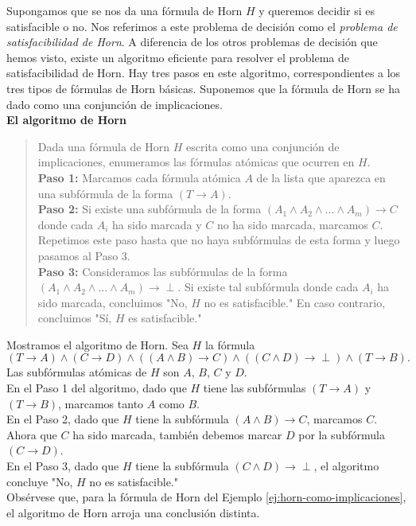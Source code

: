 \message{ !name(main.tex)}\documentclass[12pt,a4paper]{book}
\newcommand{\comillas}[1]{"#1"}
\begin{document}
    Supongamos que se nos da una fórmula de Horn $H$ y queremos decidir si es satisfacible o no. Nos referimos a este
    problema de decisión como el \textit{problema de satisfacibilidad de Horn}. A diferencia de los otros problemas de
    decisión que hemos visto, existe un algoritmo eficiente para resolver el problema de satisfacibilidad de Horn. Hay tres
    pasos en este algoritmo, correspondientes a los tres tipos de fórmulas de Horn básicas. Suponemos que la fórmula de Horn
    se ha dado como una conjunción de implicaciones.\\

    \noindent\textbf{El algoritmo de Horn}

    \begin{quote}
        Dada una fórmula de Horn $H$ escrita como una conjunción de implicaciones, enumeramos las fórmulas atómicas que
        ocurren en $H$.\\[0.2cm]
        \textbf{Paso 1:} Marcamos cada fórmula atómica $A$ de la lista que aparezca en una subfórmula de la forma
        $(T\rightarrow A)$.\\[0.2cm]
        \textbf{Paso 2:} Si existe una subfórmula de la forma $(A_{1}\wedge A_{2}\wedge\dots\wedge A_{m})\rightarrow C$ donde
        cada $A_{i}$ ha sido marcada y $C$ no ha sido marcada, marcamos $C$. Repetimos este paso hasta que no haya
        subfórmulas de esta forma y luego pasamos al Paso 3.\\[0.2cm]
        \textbf{Paso 3:} Consideramos las subfórmulas de la forma $(A_{1}\wedge A_{2}\wedge\dots\wedge A_{m})\rightarrow\perp$.
        Si existe tal subfórmula donde cada $A_{i}$ ha sido marcada, concluimos \comillas{No, $H$ no es satisfacible.} En
        caso contrario, concluimos \comillas{Sí, $H$ es satisfacible.}
    \end{quote}

    \begin{ejemplo}\label{ej:algoritmo-horn}
        Mostramos el algoritmo de Horn. Sea $H$ la fórmula
        \begin{equation*}
            (T\rightarrow A)\wedge(C\rightarrow D)\wedge((A\wedge B)\rightarrow C)\wedge((C\wedge D)\rightarrow\perp)\wedge(T\rightarrow B).
        \end{equation*}
        Las subfórmulas atómicas de $H$ son $A$, $B$, $C$ y $D$.\\
        En el Paso 1 del algoritmo, dado que $H$ tiene las subfórmulas $(T\rightarrow A)$ y $(T\rightarrow B)$, marcamos
        tanto $A$ como $B$.\\
        En el Paso 2, dado que $H$ tiene la subfórmula $(A\wedge B)\rightarrow C$, marcamos $C$. Ahora que $C$ ha sido
        marcada, también debemos marcar $D$ por la subfórmula $(C\rightarrow D)$.\\
        En el Paso 3, dado que $H$ tiene la subfórmula $(C\wedge D)\rightarrow\perp$, el algoritmo concluye \comillas{No, $H$
        no es satisfacible.}\\
        Obsérvese que, para la fórmula de Horn del Ejemplo \ref{ej:horn-como-implicaciones}, el algoritmo de Horn arroja una
        conclusión distinta.
    \end{ejemplo}
\end{document}
